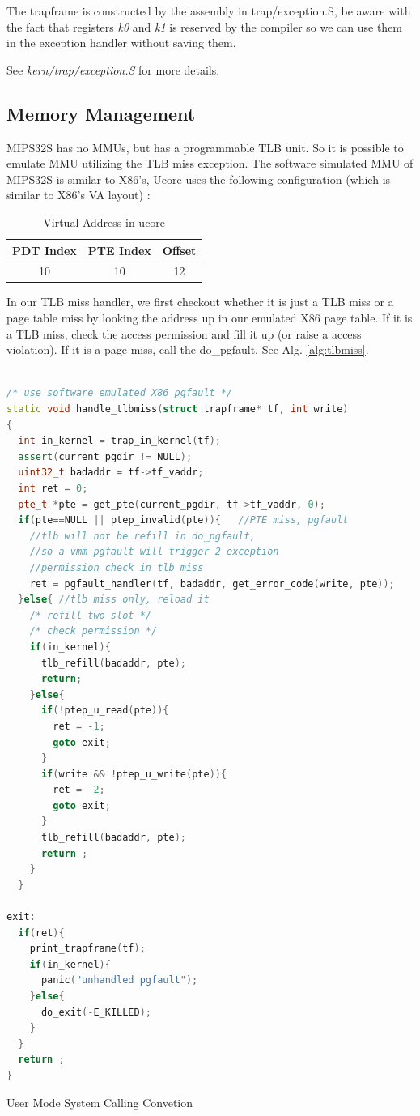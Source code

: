 \documentclass[a4paper]{article}
\begin{document}
The trapframe is constructed by the assembly in trap/exception.S, be aware with the fact that
registers \emph{k0} and \emph{k1} is reserved by the compiler so we can use them in the exception
handler without saving them.

See \emph{kern/trap/exception.S} for more details.

\subsection{Memory Management}
\label{sec:mm}
MIPS32S has no MMUs, but has a programmable TLB unit. So
it is possible to emulate MMU utilizing the TLB miss exception.
The software simulated MMU of MIPS32S is similar to X86's, 
Ucore uses the following 
configuration (which is similar to X86's VA layout) :

\begin{table}[H]
\centering
\begin{tabular}{|c|c|c|}
\hline
PDT Index & PTE Index & Offset \\
\hline
10 & 10 & 12 \\
\hline
\end{tabular}
\caption{Virtual Address in ucore}
\label{tab:va_layout}
\end{table}

In our TLB miss handler, we first checkout whether it is just a TLB miss
or a page table miss by looking the address up in our emulated X86 page table.
If it is a TLB miss, check the access permission and fill it up (or raise a
access violation). If it is a page miss, call the do\_pgfault. See Alg. \ref{alg:tlbmiss}.


\begin{algorithm}[h]

 \begin{lstlisting}[language={C++}]

/* use software emulated X86 pgfault */
static void handle_tlbmiss(struct trapframe* tf, int write)
{
  int in_kernel = trap_in_kernel(tf);
  assert(current_pgdir != NULL);
  uint32_t badaddr = tf->tf_vaddr;
  int ret = 0;
  pte_t *pte = get_pte(current_pgdir, tf->tf_vaddr, 0);
  if(pte==NULL || ptep_invalid(pte)){   //PTE miss, pgfault
    //tlb will not be refill in do_pgfault,
    //so a vmm pgfault will trigger 2 exception
    //permission check in tlb miss
    ret = pgfault_handler(tf, badaddr, get_error_code(write, pte));
  }else{ //tlb miss only, reload it
    /* refill two slot */
    /* check permission */
    if(in_kernel){
      tlb_refill(badaddr, pte); 
      return;
    }else{
      if(!ptep_u_read(pte)){
        ret = -1;
        goto exit;
      }
      if(write && !ptep_u_write(pte)){
        ret = -2;
        goto exit;
      }
      tlb_refill(badaddr, pte);
      return ;
    }
  }

exit:
  if(ret){
    print_trapframe(tf);
    if(in_kernel){
      panic("unhandled pgfault");
    }else{
      do_exit(-E_KILLED);
    }
  }
  return ;
}

\end{lstlisting}
\caption{User Mode System Calling Convetion}
\label{alg:tlbmiss}
\end{algorithm}
\end{document}
